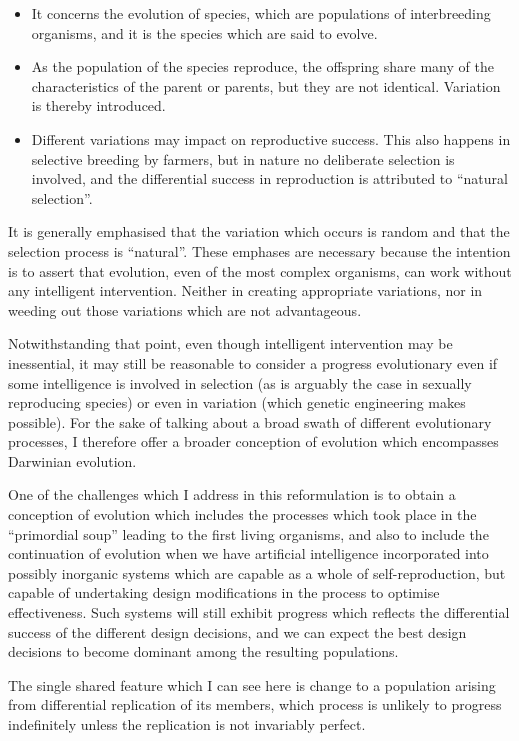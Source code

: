 \documentclass[10pt,titlepage]{book}
\begin{document}
\begin{itemize}
\item It concerns the evolution of species, which are populations of interbreeding organisms, and it is the species which are said to evolve.
\item As the population of the species reproduce, the offspring share many of the characteristics of the parent or parents, but they are not identical.
  Variation is thereby introduced.
\item Different variations may impact on reproductive success.
  This also happens in selective breeding by farmers, but in nature no deliberate selection is involved, and the differential success in reproduction is attributed to ``natural selection''.
\end{itemize}

It is generally emphasised that the variation which occurs is random and that the selection process is ``natural''.
These emphases are necessary because the intention is to assert that evolution, even of the most complex organisms, can work without any intelligent intervention.
Neither in creating appropriate variations, nor in weeding out those variations which are not advantageous.

Notwithstanding that point, even though intelligent intervention may be inessential, it may still be reasonable to consider a progress evolutionary even if some intelligence is involved in selection (as is arguably the case in sexually reproducing species) or even in variation (which genetic engineering makes possible).
For the sake of talking about a broad swath of different evolutionary processes, I therefore offer a broader conception of evolution which encompasses Darwinian evolution.

One of the challenges which I address in this reformulation is to obtain a conception of evolution which includes the processes which took place in the ``primordial soup'' leading to the first living organisms, and also to include the continuation of evolution when we have artificial intelligence incorporated into possibly inorganic systems which are capable as a whole of self-reproduction, but capable of undertaking design modifications in the process to optimise effectiveness.
Such systems will still exhibit progress which reflects the differential success of the different design decisions, and we can expect the best design decisions to become dominant among the resulting populations.

The single shared feature which I can see here is change to a population arising from differential replication of its members, which process is unlikely to progress indefinitely unless the replication is not invariably perfect.
\end{document}
